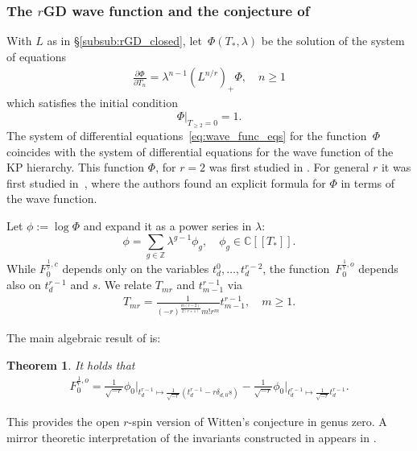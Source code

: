 \documentclass[11pt]{amsart}
\newtheorem{thm}[dummy]{Theorem}
\theoremstyle{definition}
\theoremstyle{remark}
\newcommand{\<}{\left<}
\renewcommand{\>}{\right>}
\numberwithin{equation}{section}
\def\C{{\mathbb C}}
\begin{document}
\subsubsection{The $r$GD wave function and the conjecture of \cite{BCT3}}
With $L$ as in \S \ref{subsub:rGD_closed}, let~$\Phi(T_*,\lambda)$ be the solution of the system of %
equations
\begin{gather}\label{eq:wave_func_eqs}
\frac{\partial\Phi}{\partial T_n}=\lambda^{n-1}(L^{n/r})_+\Phi,\quad n\geq 1
\end{gather}
which %
satisfies the initial condition
$$
\left.\Phi\right|_{T_{\geq 2}=0}=1.
$$
The system of differential equations~\eqref{eq:wave_func_eqs} for the function~$\Phi$ coincides with the system of differential equations for the wave function of the KP hierarchy.
This function $\Phi$, for $r=2$ was first studied in \cite{Bur16}. For general $r$ it was first studied in~\cite{BY15}, where the authors found an explicit formula for $\Phi$ in terms of the wave function.



Let $\phi:=\log\Phi$ and expand it as a power %
series in $\lambda:$
$$
\phi=\sum_{g\in\mathbb{Z}}\lambda^{g-1}\phi_g,\quad \phi_g\in\C[[T_*]].
$$
While $F^{\frac{1}{r},c}_0$ depends %
only on the variables $t^0_d,\ldots,t^{r-2}_d$, the function~$F^{\frac{1}{r},o}_0$ depends also on $t^{r-1}_d$ and $s$. We relate $T_{mr}$ and $t^{r-1}_{m-1}$ via
\begin{gather}\label{eq:r-1_coord_change}
T_{mr}=\frac{1}{(-r)^{\frac{m(r-2)}{2(r+1)}}m!r^m}t^{r-1}_{m-1},\quad m\ge 1.
\end{gather}

The main algebraic result of \cite{BCT2} is:

\begin{thm}\label{thm:main_BCT2}
It holds that
\begin{gather}\label{eq:main_res_BCT}
F^{\frac{1}{r},o}_0=\frac{1}{\sqrt{-r}}\phi_0\big|_{t^{r-1}_d\mapsto \frac{1}{\sqrt{-r}}(t^{r-1}_d-r\delta_{d,0}s)}-\frac{1}{\sqrt{-r}}\phi_0\big|_{t^{r-1}_d\mapsto\frac{1}{\sqrt{-r}}t^{r-1}_d}.
\end{gather}
\end{thm}
\noindent This provides the open $r$-spin version of Witten's conjecture in genus zero. A mirror theoretic interpretation of the invariants constructed in \cite{BCT2} appears in \cite{GKT}.
\end{document}
